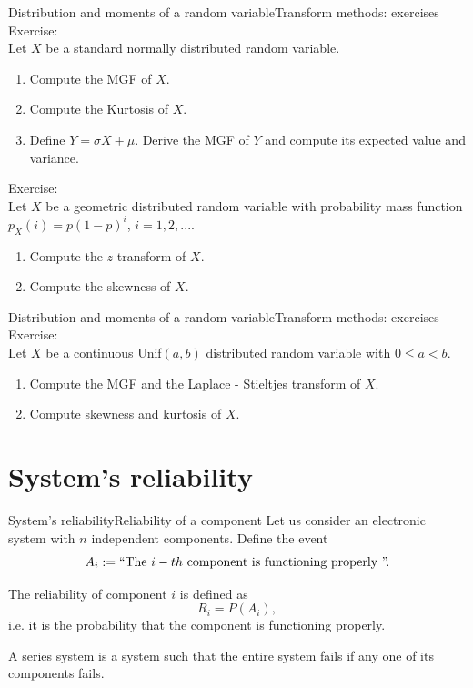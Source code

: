 \documentclass[handout]{beamer}
\begin{document}
\begin{frame}{Distribution and moments of a random variable}{Transform methods: exercises}
Exercise:\\
Let $X$ be a standard normally distributed random variable. 
\begin{enumerate}
 \item Compute the MGF of $X$.
 \item Compute the Kurtosis of $X$.
 \item Define $Y=\sigma X + \mu$. Derive the MGF of $Y$ and compute its expected value and variance.
\end{enumerate}
\vspace{0.2cm}
Exercise:\\
Let $X$ be a geometric distributed random variable with probability mass function $p_X(i) = p(1-p)^i$, $i=1,2,...$.
\begin{enumerate}
 \item Compute the $z$ transform of $X$.
 \item Compute the skewness of $X$.
\end{enumerate} 
\end{frame}

\begin{frame}{Distribution and moments of a random variable}{Transform methods: exercises}
Exercise:\\
Let $X$ be a continuous Unif$(a,b)$ distributed random variable with $0\leq a < b$. 
\begin{enumerate}
 \item Compute the MGF and the Laplace - Stieltjes transform of $X$.
 \item Compute skewness and kurtosis of $X$.
\end{enumerate}
\end{frame}
\section{System's reliability}

\begin{frame}{System's reliability}{Reliability of a component}
Let us consider an electronic system with $n$ independent components. Define the
event 
\[
 A_i:=\textnormal{\textquotedblleft The $i-th$ component is functioning properly \textquotedblright.}
\]
\begin{Definition}
 The reliability of component $i$ is defined as 
\[
 R_i = P(A_i),
\]
i.e. it is the probability that the component is functioning properly.
\end{Definition}

\begin{Definition}
 A series system is a system such that the entire system fails if any one of its components fails.
\end{Definition}
\end{frame}
\end{document}
